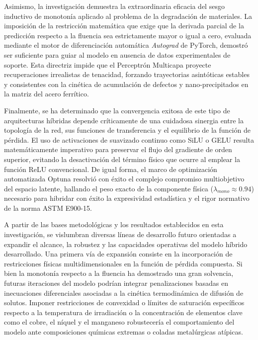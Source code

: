 \documentclass[a4paper, 12pt, twocolumn]{book}
\begin{document}
Asimismo, la investigación demuestra la extraordinaria eficacia del sesgo inductivo de monotonía aplicado al problema de la degradación de materiales. La imposición de la restricción matemática que exige que la derivada parcial de la predicción respecto a la fluencia sea estrictamente mayor o igual a cero, evaluada mediante el motor de diferenciación automática \textit{Autograd} de PyTorch, demostró ser suficiente para guiar al modelo en ausencia de datos experimentales de soporte. Esta directriz impide que el Perceptrón Multicapa proyecte recuperaciones irrealistas de tenacidad, forzando trayectorias asintóticas estables y consistentes con la cinética de acumulación de defectos y nano-precipitados en la matriz del acero ferrítico.

Finalmente, se ha determinado que la convergencia exitosa de este tipo de arquitecturas híbridas depende críticamente de una cuidadosa sinergia entre la topología de la red, sus funciones de transferencia y el equilibrio de la función de pérdida. El uso de activaciones de suavizado continuo como SiLU o GELU resulta matemáticamente imperativo para preservar el flujo del gradiente de orden superior, evitando la desactivación del término físico que ocurre al emplear la función ReLU convencional. De igual forma, el marco de optimización automatizada Optuna resolvió con éxito el complejo compromiso multiobjetivo del espacio latente, hallando el peso exacto de la componente física ($\lambda_{mono} \approx 0.94$) necesario para hibridar con éxito la expresividad estadística y el rigor normativo de la norma ASTM E900-15.


A partir de las bases metodológicas y los resultados establecidos en esta investigación, se vislumbran diversas líneas de desarrollo futuro orientadas a expandir el alcance, la robustez y las capacidades operativas del modelo híbrido desarrollado. Una primera vía de expansión consiste en la incorporación de restricciones físicas multidimensionales en la función de pérdida compuesta. Si bien la monotonía respecto a la fluencia ha demostrado una gran solvencia, futuras iteraciones del modelo podrían integrar penalizaciones basadas en inecuaciones diferenciales asociadas a la cinética termodinámica de difusión de solutos. Imponer restricciones de convexidad o límites de saturación específicos respecto a la temperatura de irradiación o la concentración de elementos clave como el cobre, el níquel y el manganeso robustecería el comportamiento del modelo ante composiciones químicas extremas o coladas metalúrgicas atípicas.
\end{document}
